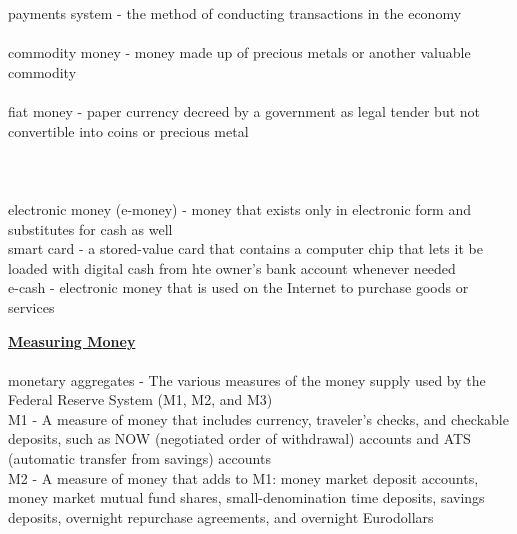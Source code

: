 \documentclass[12pt]{article}
\begin{document}
\noindent payments system - the method of conducting transactions in the economy\\

\\

\noindent commodity money - money made up of precious metals or another valuable commodity\\

\\

\noindent fiat money - paper currency decreed by a government as legal tender but not convertible into coins or precious metal\\

\\

\\

\\

\noindent electronic money (e-money) - money that exists only in electronic form and substitutes for cash as well\\

\noindent smart card - a stored-value card that contains a computer chip that lets it be loaded with digital cash from hte owner's bank account whenever needed\\

\noindent e-cash - electronic money that is used on the Internet to purchase goods or services\\

\newpage

\noindent \underline{\bf Measuring Money}\\

\\

\noindent monetary aggregates - The various measures of the money supply used by the Federal Reserve System (M1, M2, and M3)\\

\noindent M1 - A measure of money that includes currency, traveler's checks, and checkable deposits, such as NOW (negotiated order of withdrawal) accounts and ATS (automatic transfer from savings) accounts\\

\noindent M2 - A measure of money that adds to M1: money market deposit accounts, money market mutual fund shares, small-denomination time deposits, savings deposits, overnight repurchase agreements, and overnight Eurodollars \\
\end{document}
